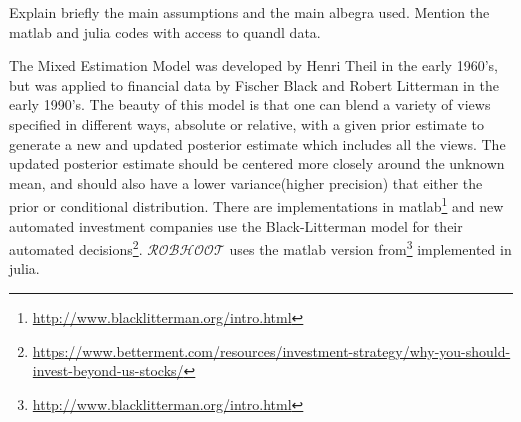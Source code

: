 \documentclass[english,12pt]{article}
\begin{document}


Explain briefly the main assumptions and the main albegra used. 
Mention the matlab and julia codes with access to quandl data.


The Mixed Estimation Model was developed by Henri Theil in the early
1960's, but was applied to financial data by Fischer Black and Robert
Litterman in the early 1990's. The beauty of this model is that one
can blend a variety of views specified in different ways, absolute or
relative, with a given prior estimate to generate a new and updated
posterior estimate which includes all the views. The updated posterior
estimate should be centered more closely around the unknown mean, and
should also have a lower variance(higher precision) that either the
prior or conditional distribution. There are implementations in
matlab\footnote{\url{http://www.blacklitterman.org/intro.html}} and
new automated investment companies use the Black-Litterman model for
their automated
decisions\footnote{\url{https://www.betterment.com/resources/investment-strategy/why-you-should-invest-beyond-us-stocks/}}.
$\mathcal{ROBHOOT}$ uses the matlab version
from\footnote{\url{http://www.blacklitterman.org/intro.html}}
implemented in julia.





\end{document}
